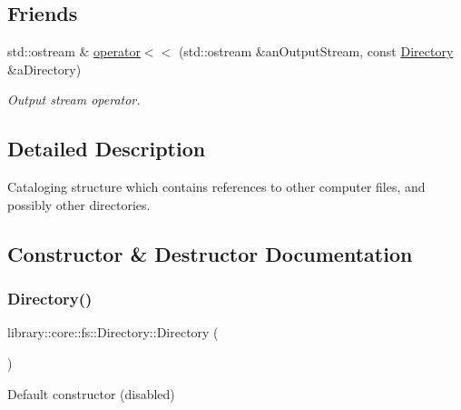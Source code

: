 \subsection*{Friends}
\begin{DoxyCompactItemize}
\item 
std\+::ostream \& \hyperlink{classlibrary_1_1core_1_1fs_1_1Directory_a3cbfede39f82ab145f110ca14e21deef}{operator$<$$<$} (std\+::ostream \&an\+Output\+Stream, const \hyperlink{classlibrary_1_1core_1_1fs_1_1Directory}{Directory} \&a\+Directory)
\begin{DoxyCompactList}\small\item\em Output stream operator. \end{DoxyCompactList}\end{DoxyCompactItemize}


\subsection{Detailed Description}
Cataloging structure which contains references to other computer files, and possibly other directories. 

\subsection{Constructor \& Destructor Documentation}
\mbox{\label{classlibrary_1_1core_1_1fs_1_1Directory_a3ec39f6cad19a81d520e9a1f2d8bb1f7}} 
\subsubsection{\texorpdfstring{Directory()}{Directory()}\hspace{0.1cm}{\footnotesize\ttfamily [1/2]}}
{\footnotesize\ttfamily library\+::core\+::fs\+::\+Directory\+::\+Directory (\begin{DoxyParamCaption}{ }\end{DoxyParamCaption})\hspace{0.3cm}{\ttfamily [delete]}}



Default constructor (disabled) 

\mbox{\label{classlibrary_1_1core_1_1fs_1_1Directory_a5685b48aa8a6332caf0e4e253d8471f7}} 
